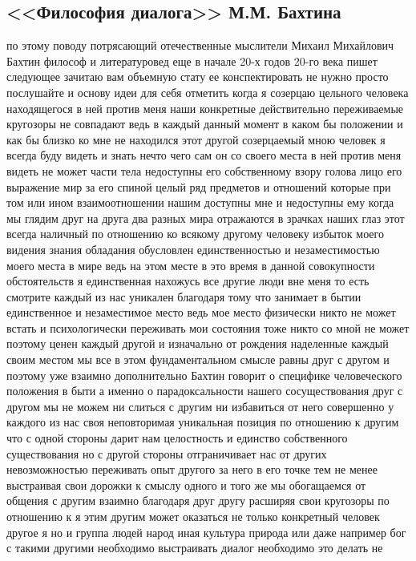\subsection{<<Философия диалога>> М.М. Бахтина}
по этому поводу
потрясающий отечественные мыслители Михаил Михайлович Бахтин философ и
литературовед еще в начале 20-х годов 20-го века пишет следующее зачитаю вам
объемную стату ее конспектировать не нужно просто послушайте и основу идеи для
себя отметить когда я созерцаю цельного человека находящегося в ней против меня
наши конкретные действительно переживаемые кругозоры не совпадают ведь в каждый
данный момент в каком бы положении и как бы близко ко мне не находился этот
другой созерцаемый мною человек я всегда буду видеть и знать нечто чего сам он
со своего места в ней против меня видеть не может части тела недоступны его
собственному взору голова лицо его выражение мир за его спиной целый ряд
предметов и отношений которые при том или ином взаимоотношении нашим доступны
мне и недоступны ему когда мы глядим друг на друга два разных мира отражаются в
зрачках наших глаз этот всегда наличный по отношению ко всякому другому человеку
избыток моего видения знания обладания обусловлен единственностью и
незаместимостью моего места в мире ведь на этом месте в это время в данной
совокупности обстоятельств я единственная нахожусь все другие люди вне меня то
есть смотрите каждый из нас уникален благодаря тому что занимает в бытии
единственное и незаместимое место ведь мое место физически никто не может встать
и психологически переживать мои состояния тоже никто со мной не может поэтому
ценен каждый другой и изначально от рождения наделенные каждый своим местом мы
все в этом фундаментальном смысле равны друг с другом и поэтому уже взаимно
дополнительно Бахтин говорит о специфике человеческого положения в быти а именно
о парадоксальности нашего сосуществования друг с другом мы не можем ни слиться с
другим ни избавиться от него совершенно у каждого из нас своя неповторимая
уникальная позиция по отношению к другим что с одной стороны дарит нам
целостность и единство собственного существования но с другой стороны
отграничивает нас от других невозможностью переживать опыт другого за него в его
точке тем не менее выстраивая свои дорожки к смыслу одного и того же мы
обогащаемся от общения с другим взаимно благодаря друг другу расширяя свои
кругозоры по отношению к я этим другим может оказаться не только конкретный
человек другое я но и группа людей народ иная культура природа или даже например
бог с такими другими необходимо выстраивать диалог необходимо это делать не
